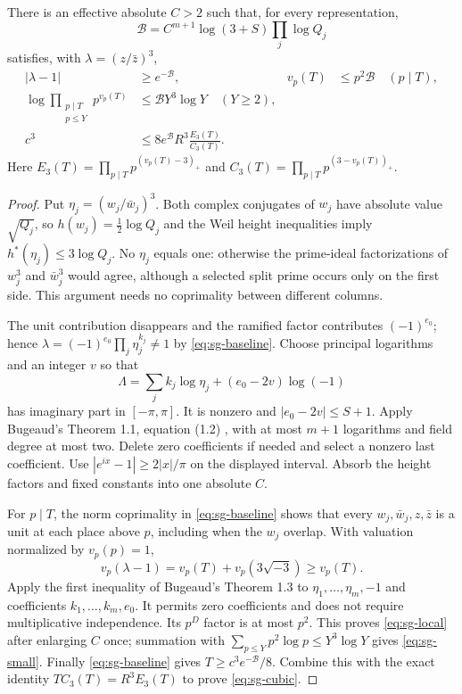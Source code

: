 \begin{theorem}
\label{thm:sg-two-place}
There is an effective absolute $C>2$ such that, for every representation,
\[
 \mathcal B=C^{m+1}\log(3+S)\prod_j\log Q_j
\]
satisfies, with $\lambda=(z/\bar z)^3$,
\begin{align}
 |\lambda-1|&\ge e^{-\mathcal B},&
 v_p(T)&\le p^2\mathcal B\quad(p\mid T),\label{eq:sg-local}\\
 \log\prod_{\substack{p\mid T\\p\le Y}}p^{v_p(T)}
 &\le\mathcal B Y^3\log Y\quad(Y\ge2),\label{eq:sg-small}\\
 c^3&\le8e^{\mathcal B}R^3\frac{E_3(T)}{C_3(T)}.\label{eq:sg-cubic}
\end{align}
Here $E_3(T)=\prod_{p\mid T}p^{(v_p(T)-3)_+}$ and
$C_3(T)=\prod_{p\mid T}p^{(3-v_p(T))_+}$.
\end{theorem}
\begin{proof}
Put $\eta_j=(w_j/\bar w_j)^3$. Both complex conjugates of $w_j$ have
absolute value $\sqrt{Q_j}$, so $h(w_j)=\tfrac12\log Q_j$ and the Weil
height inequalities imply $h^*(\eta_j)\le3\log Q_j$. No $\eta_j$ equals
one: otherwise the prime-ideal factorizations of $w_j^3$ and $\bar w_j^3$
would agree, although a selected split prime occurs only on the first side.
This argument needs no coprimality between different columns.

The unit contribution disappears and the ramified factor contributes
$(-1)^{e_0}$; hence $\lambda=(-1)^{e_0}\prod_j\eta_j^{k_j}\ne1$ by
\eqref{eq:sg-baseline}. Choose principal logarithms and an integer $v$ so that
\[
 \Lambda=\sum_jk_j\log\eta_j+(e_0-2v)\log(-1)
\]
has imaginary part in $[-\pi,\pi]$. It is nonzero and
$|e_0-2v|\le S+1$. Apply Bugeaud's Theorem 1.1, equation (1.2)
\cite{EPBugeaud2022}, with at most $m+1$ logarithms and field degree at most
two. Delete zero coefficients if needed and select a nonzero last coefficient.
Use $|e^{ix}-1|\ge2|x|/\pi$ on the displayed interval. Absorb the height
factors and fixed constants into one absolute $C$.

For $p\mid T$, the norm coprimality in \eqref{eq:sg-baseline} shows that
every $w_j,\bar w_j,z,\bar z$ is a unit at each place above $p$, including
when the $w_j$ overlap. With valuation normalized by $v_p(p)=1$,
\[
 v_p(\lambda-1)=v_p(T)+v_p(3\sqrt{-3})\ge v_p(T).
\]
Apply the first inequality of Bugeaud's Theorem 1.3 to
$\eta_1,\ldots,\eta_m,-1$ and coefficients $k_1,\ldots,k_m,e_0$.
It permits zero coefficients and does not require multiplicative independence.
Its $p^D$ factor is at most $p^2$. This proves \eqref{eq:sg-local} after
enlarging $C$ once; summation with
$\sum_{p\le Y}p^2\log p\le Y^3\log Y$ gives \eqref{eq:sg-small}.
Finally \eqref{eq:sg-baseline} gives
$T\ge c^3e^{-\mathcal B}/8$. Combine this with the exact identity
$TC_3(T)=R^3E_3(T)$ to prove \eqref{eq:sg-cubic}.
\end{proof}

